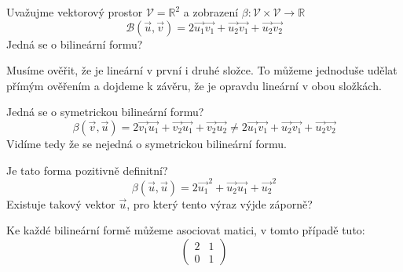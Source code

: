 \begin{example}
    Uvažujme vektorový prostor $\mathcal{V} = \mathbb{R}^2$
    a zobrazení $\beta: \mathcal{V} \times \mathcal{V} \rightarrow \mathbb{R}$
    $$\mathcal{B}(\vec{u}, \vec{v}) = 2\vec{u_1}\vec{v_1}+ \vec{u_2}\vec{v_1} + \vec{u_2}\vec{v_2}$$
    Jedná se o bilineární formu?

    Musíme ověřit, že je lineární v první i druhé složce. To můžeme jednoduše udělat přímým ověřením
    a dojdeme k závěru, že je opravdu lineární v obou složkách.

    Jedná se o symetrickou bilineární formu?
    $$\beta(\vec{v}, \vec{u}) = 2\vec{v_1}\vec{u_1}+ \vec{v_2}\vec{u_1} + \vec{v_2}\vec{u_2} \neq
    2\vec{u_1}\vec{v_1}+ \vec{u_2}\vec{v_1} + \vec{u_2}\vec{v_2}$$
    Vidíme tedy že se nejedná o symetrickou bilineární formu.

    Je tato forma pozitivně definitní?
    $$\beta(\vec{u}, \vec{u}) = 2\vec{u_1}^2 + \vec{u_2}\vec{u_1} + \vec{u_2}^2$$
    Existuje takový vektor $\vec{u}$, pro který tento výraz výjde záporně?

    Ke každé bilineární formě můžeme asociovat matici, v tomto případě tuto:
    \[
    \begin{pmatrix}
        2 & 1\\
        0 & 1
    \end{pmatrix}
    \]
\end{example}

